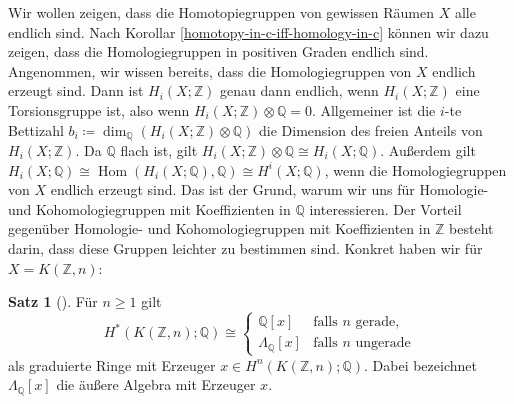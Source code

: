 \documentclass[11pt, a4paper, german]{article}
\theoremstyle{definition}
\newtheorem{satz}[lem]{Satz}
\theoremstyle{remark}
\newcommand{\Z}{\mathbb{Z}} %
\newcommand{\Q}{\mathbb{Q}} %
\DeclareMathOperator{\Hom}{Hom} %
\begin{document}
Wir wollen zeigen, dass die Homotopiegruppen von gewissen Räumen $X$ alle endlich sind.
Nach Korollar \ref{homotopy-in-c-iff-homology-in-c} können wir dazu zeigen, dass die Homologiegruppen in positiven Graden endlich sind.
Angenommen, wir wissen bereits, dass die Homologiegruppen von $X$ endlich erzeugt sind.
Dann ist $H_i(X; \Z)$ genau dann endlich, wenn $H_i(X; \Z)$ eine Torsionsgruppe ist, also wenn $H_i(X; \Z) \otimes \Q = 0$.
Allgemeiner ist die $i$-te Bettizahl $b_i \coloneqq \dim_\Q(H_i(X; \Z) \otimes \Q)$ die Dimension des freien Anteils von $H_i(X; \Z)$.
Da $\Q$ flach ist, gilt $H_i(X; \Z) \otimes \Q \cong H_i(X; \Q)$.
Außerdem gilt $H_i(X; \Q) \cong \Hom(H_i(X; \Q), \Q) \cong H^i(X; \Q)$, wenn die Homologiegruppen von $X$ endlich erzeugt sind.
Das ist der Grund, warum wir uns für Homologie- und Kohomologiegruppen mit Koeffizienten in $\Q$ interessieren.
Der Vorteil gegenüber Homologie- und Kohomologiegruppen mit Koeffizienten in $\Z$ besteht darin, dass diese Gruppen leichter zu bestimmen sind.
Konkret haben wir für $X = K(\Z, n)$:

\begin{satz}[{\cite[Lem 1.20]{hatcher:ss}}]\label{rational-homology-kzn}
  Für $n \geq 1$ gilt
  \vspace{-1em}
  \[
    H^*(K(\Z, n); \Q) \cong \begin{cases}
      \Q[x] & \text{falls $n$ gerade}, \\
      \Lambda_\Q[x] & \text{falls $n$ ungerade}
    \end{cases}
  \]
  als graduierte Ringe mit Erzeuger $x \in H^n(K(\Z, n); \Q)$.
  Dabei bezeichnet $\Lambda_\Q[x]$ die äußere Algebra mit Erzeuger $x$.
\end{satz}
\end{document}
